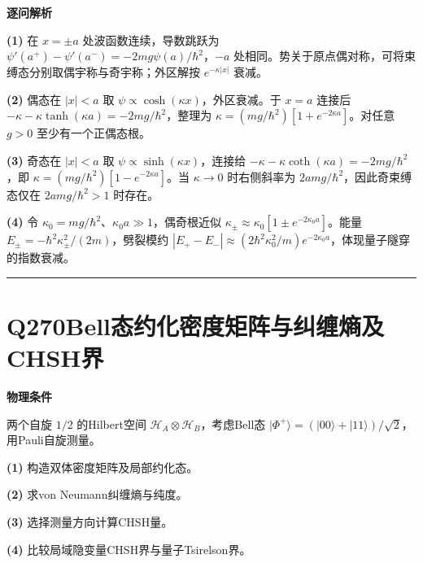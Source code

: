 \documentclass[UTF8,a4paper,11pt,oneside,openany]{ctexbook}
\begin{document}
\par\medskip\noindent\textbf{逐问解析}
\par\noindent\textbf{(1)} 在 \(x=\pm a\) 处波函数连续，导数跳跃为 \(\psi'(a^+)-\psi'(a^-)=-2mg\psi(a)/\hbar^2\)，\(-a\) 处相同。势关于原点偶对称，可将束缚态分别取偶宇称与奇宇称；外区解按 \(e^{-\kappa|x|}\) 衰减。
\par\noindent\textbf{(2)} 偶态在 \(|x|<a\) 取 \(\psi\propto\cosh(\kappa x)\)，外区衰减。于 \(x=a\) 连接后 \(-\kappa-\kappa\tanh(\kappa a)=-2mg/\hbar^2\)，整理为 \(\kappa=(mg/\hbar^2)[1+e^{-2\kappa a}]\)。对任意 \(g>0\) 至少有一个正偶态根。
\par\noindent\textbf{(3)} 奇态在 \(|x|<a\) 取 \(\psi\propto\sinh(\kappa x)\)，连接给 \(-\kappa-\kappa\coth(\kappa a)=-2mg/\hbar^2\)，即 \(\kappa=(mg/\hbar^2)[1-e^{-2\kappa a}]\)。当 \(\kappa\to0\) 时右侧斜率为 \(2amg/\hbar^2\)，因此奇束缚态仅在 \(2amg/\hbar^2>1\) 时存在。
\par\noindent\textbf{(4)} 令 \(\kappa_0=mg/\hbar^2\)、\(\kappa_0a\gg1\)，偶奇根近似 \(\kappa_\pm\approx\kappa_0[1\pm e^{-2\kappa_0a}]\)。能量 \(E_\pm=-\hbar^2\kappa_\pm^2/(2m)\)，劈裂模约 \(|E_+-E_-|\approx(2\hbar^2\kappa_0^2/m)e^{-2\kappa_0a}\)，体现量子隧穿的指数衰减。

\par\bigskip\hrule\bigskip
\section*{Q270\quad Bell态约化密度矩阵与纠缠熵及CHSH界}
\textbf{物理条件}\par 两个自旋 \(1/2\) 的Hilbert空间 \(\mathcal H_A\otimes\mathcal H_B\)，考虑Bell态 \(|\Phi^+\rangle=(|00\rangle+|11\rangle)/\sqrt2\)，用Pauli自旋测量。
\par\noindent\textbf{(1)} 构造双体密度矩阵及局部约化态。
\par\noindent\textbf{(2)} 求von Neumann纠缠熵与纯度。
\par\noindent\textbf{(3)} 选择测量方向计算CHSH量。
\par\noindent\textbf{(4)} 比较局域隐变量CHSH界与量子Tsirelson界。
\end{document}
